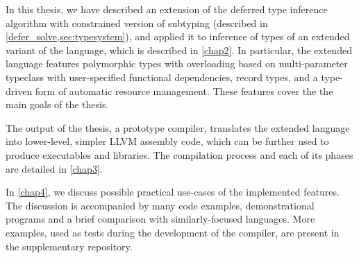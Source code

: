 

In this thesis, we have described an extension of the deferred type inference algorithm with constrained version of subtyping (described in \cref{defer_solve,sec:typesystem}), and applied it to inference of types of an extended variant of the \cmm language, which is described in \cref{chap2}. In particular, the extended \cmm language features polymorphic types with overloading based on multi-parameter typeclass with user-specified functional dependencies, record types, and a type-driven form of automatic resource management. These features cover the the main goals of the thesis.

The output of the thesis, a prototype compiler, translates the extended \cmm language into lower-level, simpler LLVM assembly code, which can be further used to produce executables and libraries. The compilation process and each of its phases are detailed in \cref{chap3}.

In \cref{chap4}, we discuss possible practical use-cases of the implemented features. The discussion is accompanied by many code examples, demonstrational programs and a brief comparison with similarly-focused languages. More examples, used as tests during the development of the compiler, are present in the supplementary repository\cmmrepo.




